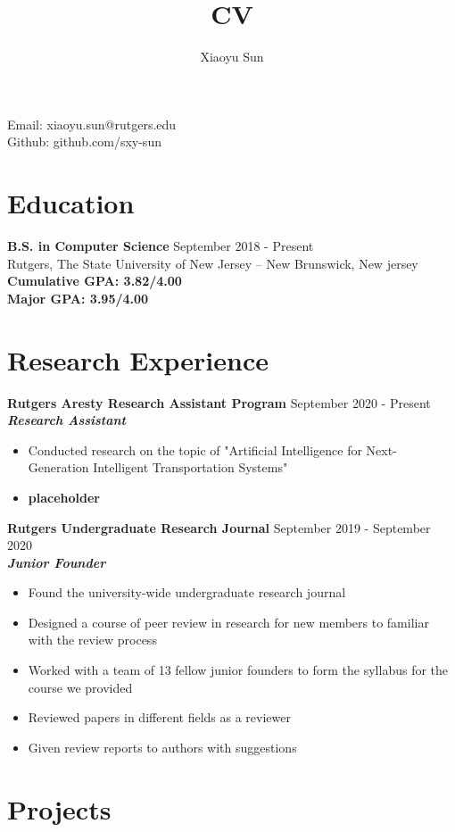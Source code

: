 \documentclass{article}
\makeatletter
\renewcommand{\maketitle}{
\begin{center}
{\huge\bfseries
\theauthor}

\vspace{.25em}

Email: xiaoyu.sun@rutgers.edu\\
Github: github.com/sxy-sun
\end{center}
}
\makeatother
\begin{document}
\title{CV}
\author{Xiaoyu Sun}
\maketitle

\section{Education}
\textbf{B.S. in Computer Science} \space 
\hfill{September 2018 - Present}\\
Rutgers, The State University of New Jersey – New Brunswick, New jersey \\
\textbf{Cumulative GPA: 3.82/4.00}\\
\textbf{Major GPA: 3.95/4.00}

\section{Research Experience}
\textbf{Rutgers Aresty Research Assistant Program}
\hfill{September 2020 - Present}\\
\textit{\textbf{Research Assistant}}
\begin{itemize}
  \itemsep0em
  \item Conducted research on the topic of "Artificial Intelligence for Next-Generation Intelligent Transportation Systems"\\
  \item \textbf{placeholder}
\end{itemize}

\noindent \textbf{Rutgers Undergraduate Research Journal}
\hfill{September 2019 - September 2020}\\
\textit{\textbf{Junior Founder}}
\begin{itemize}
  \itemsep0em
  \item Found the university-wide undergraduate research journal
  \item Designed a course of peer review in research for new members to familiar with the
review process
  \item  Worked with a team of 13 fellow junior founders to form the syllabus for the course we
provided
  \item Reviewed papers in different fields as a reviewer
  \item Given review reports to authors with suggestions
\end{itemize}


\section{Projects}
\end{document}
